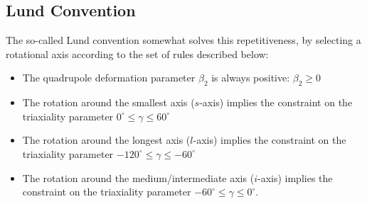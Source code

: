 \subsection{Lund Convention}
\label{subsection-lund-convention}

The so-called Lund convention \cite{andersson1976nuclear} somewhat solves this repetitiveness, by selecting a rotational axis according to the set of rules described below:
\begin{itemize}
    \item The quadrupole deformation parameter $\beta_2$ is always positive: $\beta_2\geq 0$
    \item The rotation around the smallest axis ($s$-axis) implies the constraint on the triaxiality parameter $0^\circ\leq\gamma\leq60^\circ$
    \item The rotation around the longest axis ($l$-axis) implies the constraint on the triaxiality parameter $-120^\circ\leq\gamma\leq-60^\circ$
    \item The rotation around the medium/intermediate axis ($i$-axis) implies the constraint on the triaxiality parameter $-60^\circ\leq\gamma\leq 0^\circ$.
\end{itemize}

